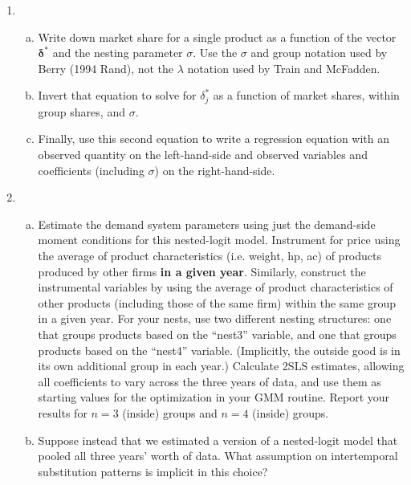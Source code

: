 \documentclass[12pt]{article}
\newcounter{mycounter} %
\begin{document}
\begin{enumerate}
\setcounter{enumi}{\value{mycounter}}
\item
    \begin{enumerate}[(a)]
    \item Write down market share for a single product as a function of the vector \(\boldsymbol{\delta}^*\) and the nesting parameter \(\sigma\). Use the \(\sigma\) and group notation used by Berry (1994 Rand), not the \(\lambda\) notation used by Train and McFadden.
    \item Invert that equation to solve for \(\delta_{j}^*\) as a function of market shares, within group shares, and \(\sigma\).
    \item Finally, use this second equation to write a regression equation with an observed quantity on the left-hand-side and observed variables and coefficients (including \(\sigma\)) on the right-hand-side.
    \end{enumerate}
\item \begin{enumerate}[(a)]
    \item Estimate the demand system parameters using just the demand-side moment conditions for this nested-logit model. 
        Instrument for price using the average of product characteristics (i.e. weight, hp, ac) of products produced by other firms \textbf{in a given year}. Similarly, construct the instrumental variables by using the average of product characteristics of other products (including those of the same firm) within the same group in a given year. For your nests, use two different nesting structures: one that groups products based on the ``nest3'' variable, and one that groups products based on the ``nest4'' variable. (Implicitly, the outside good is in its own additional group in each year.) 
Calculate 2SLS estimates, allowing all coefficients to vary across the three years of data, and use them as starting values for the optimization in your GMM routine. Report your results for $n=3$ (inside) groups and \(n=4\) (inside) groups.
    \item Suppose instead that we estimated a version of a nested-logit model that pooled all three years' worth of data. What assumption on intertemporal substitution patterns is implicit in this choice?

\end{enumerate}
\end{enumerate}
\end{document}
